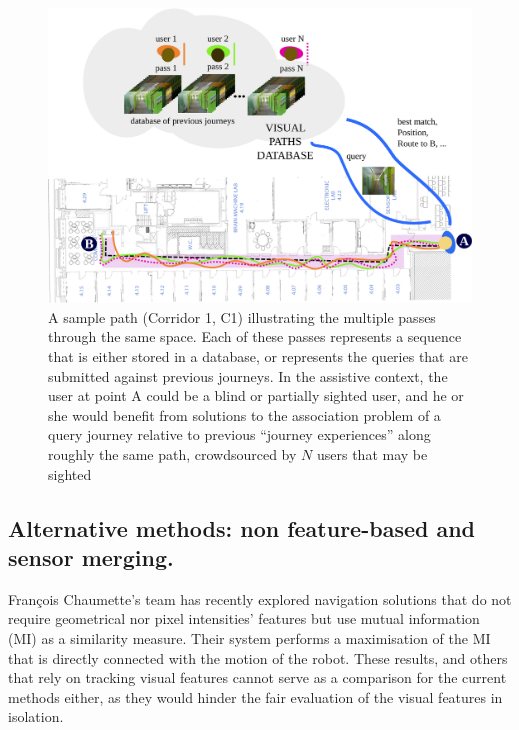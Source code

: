 \begin{figure}[t]

\begin{center}
\includegraphics[width=\linewidth]{./gfx/Chapter04/corridor.pdf}
\caption{ A sample path (Corridor 1, C1) illustrating the multiple passes through the same space. Each of these passes represents a sequence that is either stored in a database, or represents the queries that are submitted against previous journeys. In the assistive context, the user at point A could be a blind or partially sighted user, and he or she would benefit from solutions to the association problem of a query journey relative to previous ``journey experiences'' along roughly the same path, crowdsourced by $N$ users that may be sighted}
\label{fig:visualpaths}
\end{center}
\end{figure}

\subsection{Alternative methods: non feature-based and sensor merging.} 
Fran\c{c}ois Chaumette's team has  recently explored navigation solutions that do not require geometrical nor pixel intensities' features but use mutual information (MI) as a similarity measure. Their system performs a maximisation of the MI that is directly connected with the motion of the robot. These results, and others that rely on tracking visual features \cite{Se2002} cannot serve as a comparison for the current methods either, as they would hinder the fair evaluation of the visual features in isolation.

